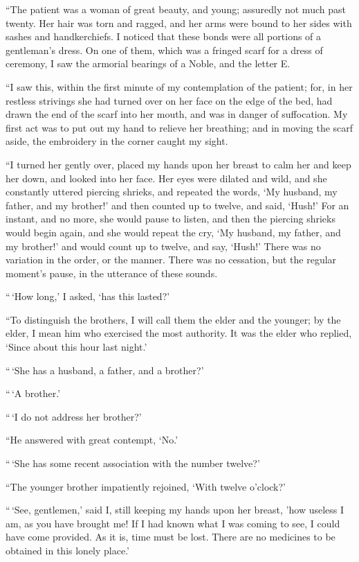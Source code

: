 ``The patient was a woman of great beauty, and young; assuredly not
much past twenty.  Her hair was torn and ragged, and her arms were
bound to her sides with sashes and handkerchiefs.  I noticed that
these bonds were all portions of a gentleman's dress.  On one of
them, which was a fringed scarf for a dress of ceremony, I saw the
armorial bearings of a Noble, and the letter E.

``I saw this, within the first minute of my contemplation of the
patient; for, in her restless strivings she had turned over on her
face on the edge of the bed, had drawn the end of the scarf into her
mouth, and was in danger of suffocation.  My first act was to put out
my hand to relieve her breathing; and in moving the scarf aside, the
embroidery in the corner caught my sight.

``I turned her gently over, placed my hands upon her breast to calm
her and keep her down, and looked into her face.  Her eyes were
dilated and wild, and she constantly uttered piercing shrieks, and
repeated the words, `My husband, my father, and my brother!'  and
then counted up to twelve, and said, `Hush!' For an instant, and no
more, she would pause to listen, and then the piercing shrieks would
begin again, and she would repeat the cry, `My husband, my father,
and my brother!' and would count up to twelve, and say, `Hush!' There
was no variation in the order, or the manner.  There was no cessation,
but the regular moment's pause, in the utterance of these sounds.

``\,`How long,' I asked, `has this lasted?'

``To distinguish the brothers, I will call them the elder and the
younger; by the elder, I mean him who exercised the most authority.
It was the elder who replied, `Since about this hour last night.'

``\,`She has a husband, a father, and a brother?'

``\,`A brother.'

``\,`I do not address her brother?'

``He answered with great contempt, `No.'

``\,`She has some recent association with the number twelve?'

``The younger brother impatiently rejoined, `With twelve o'clock?'

``\,`See, gentlemen,' said I, still keeping my hands upon her breast,
'how useless I am, as you have brought me!  If I had known what I was
coming to see, I could have come provided.  As it is, time must be
lost.  There are no medicines to be obtained in this lonely place.'

